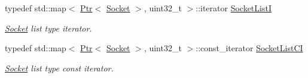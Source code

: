 \begin{DoxyCompactItemize}
typedef std\+::map$<$ \hyperlink{classns3_1_1Ptr}{Ptr}$<$ \hyperlink{classns3_1_1Socket}{Socket} $>$, uint32\+\_\+t $>$\+::iterator \hyperlink{classns3_1_1Rip_a0395b3977eeeb90190ccfa5758a3957f}{Socket\+ListI}
\begin{DoxyCompactList}\small\item\em \hyperlink{classns3_1_1Socket}{Socket} list type iterator. \end{DoxyCompactList}\item 
typedef std\+::map$<$ \hyperlink{classns3_1_1Ptr}{Ptr}$<$ \hyperlink{classns3_1_1Socket}{Socket} $>$, uint32\+\_\+t $>$\+::const\+\_\+iterator \hyperlink{classns3_1_1Rip_a685ab5baf3f942d84aba0c3d4784035f}{Socket\+List\+CI}
\begin{DoxyCompactList}\small\item\em \hyperlink{classns3_1_1Socket}{Socket} list type const iterator. \end{DoxyCompactList}\end{DoxyCompactItemize}
